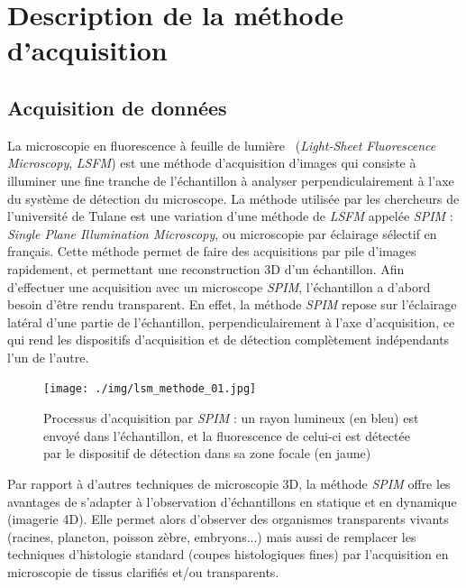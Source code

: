 \documentclass[utf8]{stageM2R}
\begin{document}
	\chapter{Description de la méthode d'acquisition}\label{section:02_description}
	{
		\section{Acquisition de données}\label{section:02_01_acquisition}
		{
			La microscopie en fluorescence à feuille de lumière~\cite{girard2011microscopie} (\textit{Light-Sheet Fluorescence Microscopy}, \textit{LSFM}) est une méthode d'acquisition d'images qui consiste à illuminer une fine tranche de l'échantillon à analyser perpendiculairement à l'axe du système de détection du microscope. La méthode utilisée par les chercheurs de l'université de Tulane est une variation d'une méthode de \textit{LSFM} appelée \textit{SPIM} : \textit{Single Plane Illumination Microscopy}, ou microscopie par éclairage sélectif en français. Cette méthode permet de faire des acquisitions par pile d'images rapidement, et permettant une reconstruction 3D d'un échantillon. Afin d'effectuer une acquisition avec un microscope \textit{SPIM}, l'échantillon a d'abord besoin d'être rendu transparent. En effet, la méthode \textit{SPIM} repose sur l'éclairage latéral d'une partie de l'échantillon, perpendiculairement à l'axe d'acquisition, ce qui rend les dispositifs d'acquisition et de détection complètement indépendants l'un de l'autre.\\

			\begin{figure}[H]
				\centering
				\texttt{[image: ./img/lsm\_methode\_01.jpg]}
				\caption{Processus d'acquisition par \textit{SPIM} : un rayon lumineux (en bleu) est envoyé dans l'échantillon, et la fluorescence de celui-ci est détectée par le dispositif de détection dans sa zone focale (en jaune)}
				\label{img:lsm_01_how_it_works}
			\end{figure}

			Par rapport à d'autres techniques de microscopie 3D, la méthode \textit{SPIM} offre les avantages de s’adapter à l'observation d’échantillons en statique et en dynamique (imagerie 4D). Elle permet alors d’observer des organismes transparents vivants (racines, plancton, poisson zèbre, embryons...) mais aussi de remplacer les techniques d’histologie standard (coupes histologiques fines) par l'acquisition en microscopie de tissus clarifiés et/ou transparents.\\

}}
\end{document}
